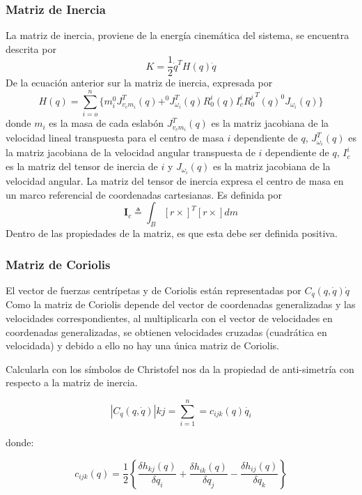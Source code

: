 \documentclass[journal, trans, spanish]{IEEEtran}
\begin{document}
\subsubsection{Matriz de Inercia}
La matriz de inercia, proviene de la energía cinemática del sistema, se encuentra descrita por
\begin{equation*}
    K = \frac{1}{2} \dot{q}^T H(q)\dot{q}
\end{equation*}
De la ecuación anterior sur la matriz de inercia, expresada por
\begin{equation*}
    H(q) = \sum_{i=o} ^n \{ m_i ^0 J_{v_cm_i} ^T(q) + ^0J_{\omega_i} ^T (q) R_0 ^i(q) I_c ^i {R_0 ^i}^T (q) ^0 J_{\omega_i} (q) \}
\end{equation*}
donde $m_i$ es la masa de cada eslabón $J_{v_cm_i}^T(q)$ es la matriz jacobiana de la velocidad lineal transpuesta para el centro de masa $i$ dependiente de $q$, $J_{\omega_i} ^T (q)$ es la matriz jacobiana de la velocidad angular transpuesta de $i$  dependiente de $q$, $I_c ^i$ es la matriz del tensor de inercia de $i$ y $J_{\omega_i} (q)$ es la matriz jacobiana de la velocidad angular.
La matriz del tensor de inercia expresa el centro de masa en un marco referencial de coordenadas cartesianas. Es definida por
\begin{equation*}
    \textbf{I}_c \triangleq \int_B [r \times]^T [r \times] dm 
\end{equation*}
Dentro de las propiedades de la matriz, es que esta debe ser definida positiva. \\

\subsubsection{Matriz de Coriolis}
El vector de fuerzas centrípetas y de Coriolis están representadas por $C_{q}(q,\dot{q})\dot{q}$ 
Como la matriz de Coriolis depende del vector de coordenadas generalizadas y las velocidades correspondientes, al multiplicarla con el vector de velocidades en coordenadas generalizadas, se obtienen velocidades cruzadas (cuadrática en velocidada) y debido a ello no hay una única matriz de Coriolis. 

Calcularla con los símbolos de Christofel nos da la propiedad de anti-simetría con respecto a la matriz de inercia.

$$\left | C_{q}(q,\dot{q}) \right |{k j}=\sum_{i=1}^{n}=c_{ijk}(q)\dot{q_{i}}$$

donde: 

$$c_{ijk}(q)=\frac{1}{2}\left \{ \frac{\delta h_{kj}(q)}{\delta q_{i}}+\frac{\delta h_{ik}(q)}{\delta q_{j}}-\frac{\delta h_{ij}(q)}{\delta q_{k}} \right \}$$
\end{document}
